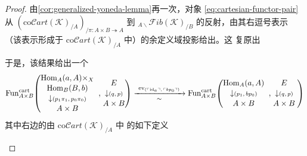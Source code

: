 \begin{proof}
由\cref{cor:generalized-yoneda-lemma}再一次，对象 \eqref{eq:cartesian-functor-pair}
从 $(\mathrm{co}\mathcal{C}\mathit{art}(\mathcal{K})_{/A})_{/\pi\colon A\times B\twoheadrightarrow A}$
到 ${}_{A\backslash}\mathcal{F}\mathit{ib}(\mathcal{K})_{/B}$ 的反射，由其右逗号表示%
（该表示形成于 $\mathrm{co}\mathcal{C}\mathit{art}(\mathcal{K})_{/A}$ 中）的余定义域投影给出。这
复原出\trTwoSidedFibration
\begin{center}
\end{center}
于是，该结果给出一个\trEquivalence
{\small\[
\mathrm{Fun}_{A\times B}^{\mathrm{cart}}\!\left(
\begin{gathered}
\mathrm{Hom}_{A}(a,A)\times_{X}\\[-2pt]
\mathrm{Hom}_{B}(B,b)\\[-2pt]
\downarrow\scriptstyle (p_{1}\pi_{1},\,p_{0}\pi_{0})\\[-2pt]
A\times B
\end{gathered}
\;\right.,
\left.
\begin{gathered}
E\\[-2pt]
\downarrow\scriptstyle (q,\,p)\\[-2pt]
A\times B
\end{gathered}
\right)
\xrightarrow[\ \sim\ ]{\ \mathrm{ev}_{(\qcor{\mathrm{id}_{a}},\,\qcor{bp_{0}})}\ }
\mathrm{Fun}_{A\times B}^{\mathrm{cart}}\!\left(
\begin{gathered}
\mathrm{Hom}_{A}(a,A)\\[-2pt]
\downarrow\scriptstyle (p_{1},\,bp_{0})\\[-2pt]
A\times B
\end{gathered}
\;\right.,
\left.
\begin{gathered}
E\\[-2pt]
\downarrow\scriptstyle (q,\,p)\\[-2pt]
A\times B
\end{gathered}
\;\right)
\]}
其中右边的\trFunctorSpace{}由 $\mathrm{co}\mathcal{C}\mathit{art}(\mathcal{K})_{/A}$ 中%
\trFunctorSpace{}的如下\trPullback{}定义
\begin{center}

\end{center}
\end{proof}
